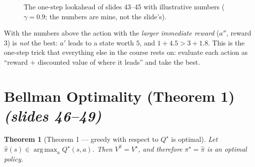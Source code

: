 \documentclass[11pt,a4paper]{article}
\DeclareMathOperator*{\argmax}{arg\,max}
\newcommand{\slr}[1]{\texorpdfstring{\emph{(slides #1)}}{(slides #1)}}
\theoremstyle{plain}
\newtheorem{theorem}{Theorem}[section]
\theoremstyle{definition}
\theoremstyle{remark}
\begin{document}
\begin{figure}[htbp]
\centering
{}
\caption{The one-step lookahead of slides 43--45 with illustrative numbers ($\gamma=0.9$; the numbers are mine, not the slide's).}
\end{figure}

\begin{intuition}
With the numbers above the action with the \emph{larger immediate reward} ($a''$, reward $3$) is \emph{not} the best: $a'$ leads to a state worth $5$, and $1+4.5>3+1.8$. This is the one-step trick that everything else in the course rests on: evaluate each action as ``reward + discounted value of where it leads'' and take the best.
\end{intuition}

\section{Bellman Optimality (Theorem 1) \slr{46--49}}
\begin{theorem}[Theorem 1 --- greedy with respect to $Q^\star$ is optimal]\label{thm:greedy}
Let $\hat\pi(s)\in\argmax_aQ^\star(s,a)$. Then $V^{\hat\pi}=V^\star$, and therefore $\pi^\star=\hat\pi$ is an optimal policy.
\end{theorem}
\end{document}
